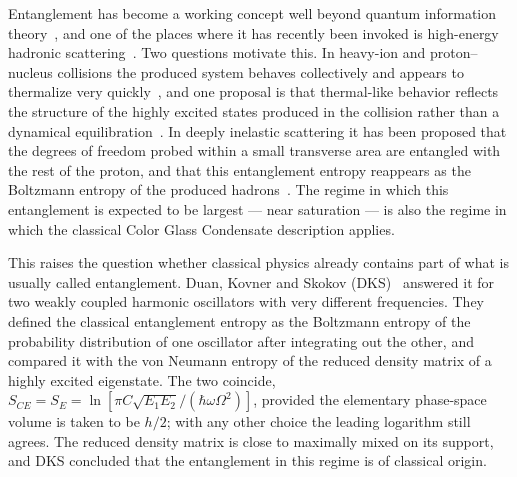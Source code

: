\documentclass[aps,preprint,12pt,superscriptaddress,nofootinbib]{revtex4-2}
\begin{document}
Entanglement has become a working concept well beyond quantum information
theory~\cite{Klco}, and one of the places where it has recently been invoked is
high-energy hadronic scattering~\cite{KharzeevLevin,Hagiwara,TuKharzeev}. Two
questions motivate this. In heavy-ion and proton--nucleus collisions the produced
system behaves collectively and appears to thermalize very quickly~\cite{Baier,Berges},
and one proposal is that thermal-like behavior reflects the structure of the highly
excited states produced in the collision rather than a dynamical
equilibration~\cite{Deutsch}. In deeply inelastic scattering it has been proposed
that the degrees of freedom probed within a small transverse area are entangled with
the rest of the proton, and that this entanglement entropy reappears as the
Boltzmann entropy of the produced hadrons~\cite{KharzeevLevin}. The regime in which
this entanglement is expected to be largest --- near saturation --- is also the
regime in which the classical Color Glass Condensate description applies.

This raises the question whether classical physics already contains part of what is
usually called entanglement. Duan, Kovner and Skokov (DKS)~\cite{DKS} answered it for
two weakly coupled harmonic oscillators with very different frequencies. They
defined the classical entanglement entropy as the Boltzmann entropy of the
probability distribution of one oscillator after integrating out the other, and
compared it with the von Neumann entropy of the reduced density matrix of a highly
excited eigenstate. The two coincide,
$S_{CE}=S_{E}=\ln[\pi C\sqrt{E_{1}E_{2}}/(\hbar\omega\Omega^{2})]$, provided the
elementary phase-space volume is taken to be $h/2$; with any other choice the
leading logarithm still agrees. The reduced density matrix is close to maximally
mixed on its support, and DKS concluded that the entanglement in this regime is of
classical origin.
\end{document}
